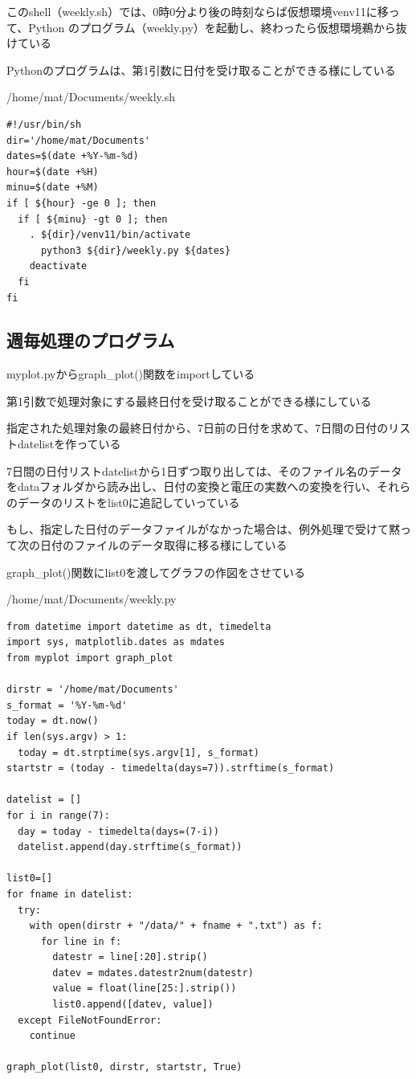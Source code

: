 \documentclass[12pt,a4paper,uplatex]{jsarticle}
\begin{document}
このshell（weekly.sh）では、0時0分より後の時刻ならば仮想環境venv11に移って、Python のプログラム（weekly.py）を起動し、終わったら仮想環境鵜から抜けている

Pythonのプログラムは、第1引数に日付を受け取ることができる様にしている

\begin{itembox}[l]{/home/mat/Documents/weekly.sh}
	\begin{verbatim}
#!/usr/bin/sh
dir='/home/mat/Documents'
dates=$(date +%Y-%m-%d)
hour=$(date +%H)
minu=$(date +%M)
if [ ${hour} -ge 0 ]; then
  if [ ${minu} -gt 0 ]; then
    . ${dir}/venv11/bin/activate
      python3 ${dir}/weekly.py ${dates}
    deactivate
  fi
fi
	\end{verbatim}
\end{itembox}

\subsection{週毎処理のプログラム}

	myplot.pyからgraph\_plot()関数をimportしている
	
	第1引数で処理対象にする最終日付を受け取ることができる様にしている
	
	指定された処理対象の最終日付から、7日前の日付を求めて、7日間の日付のリストdatelistを作っている
	
	7日間の日付リストdatelistから1日ずつ取り出しては、そのファイル名のデータをdataフォルダから読み出し、日付の変換と電圧の実数への変換を行い、それらのデータのリストをlist0に追記していっている
	
	もし、指定した日付のデータファイルがなかった場合は、例外処理で受けて黙って次の日付のファイルのデータ取得に移る様にしている
	
	graph\_plot()関数にlist0を渡してグラフの作図をさせている

\begin{itembox}[l]{/home/mat/Documents/weekly.py}
	\begin{verbatim}
from datetime import datetime as dt, timedelta
import sys, matplotlib.dates as mdates
from myplot import graph_plot

dirstr = '/home/mat/Documents'
s_format = '%Y-%m-%d'
today = dt.now()
if len(sys.argv) > 1:
  today = dt.strptime(sys.argv[1], s_format)
startstr = (today - timedelta(days=7)).strftime(s_format)

datelist = []
for i in range(7):
  day = today - timedelta(days=(7-i))
  datelist.append(day.strftime(s_format))

list0=[]
for fname in datelist:
  try:
    with open(dirstr + "/data/" + fname + ".txt") as f:
      for line in f:
        datestr = line[:20].strip()
        datev = mdates.datestr2num(datestr)
        value = float(line[25:].strip())
        list0.append([datev, value])
  except FileNotFoundError:
    continue

graph_plot(list0, dirstr, startstr, True)
	\end{verbatim}
\end{itembox}
\end{document}
